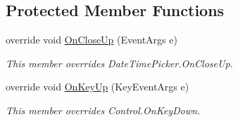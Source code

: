 \subsection*{Protected Member Functions}
\begin{DoxyCompactItemize}
\item 
override void \hyperlink{class_products_1_1_u_i_1_1_controls_1_1_nullable_date_time_picker_af4adf75cdc0f92177fef60b2fc85a590}{On\+Close\+Up} (Event\+Args e)
\begin{DoxyCompactList}\small\item\em This member overrides Date\+Time\+Picker.\+On\+Close\+Up. \end{DoxyCompactList}\item 
override void \hyperlink{class_products_1_1_u_i_1_1_controls_1_1_nullable_date_time_picker_ae4e0f476dc71039264be57709d636674}{On\+Key\+Up} (Key\+Event\+Args e)
\begin{DoxyCompactList}\small\item\em This member overrides Control.\+On\+Key\+Down. \end{DoxyCompactList}\end{DoxyCompactItemize}
